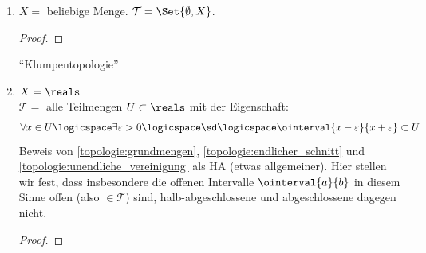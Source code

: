 \begin{beispiele}
    \begin{enumerate}
        \item \label{klumpentopologie}\( X= \) beliebige Menge. \( \mathcal{T}=\Set{\emptyset, X} \).
        \begin{proof}
        \end{proof}
        \enquote{Klumpentopologie}
        
        \item \label{standard-topologie}\( X=\reals \)\\
        \( \mathcal{T}= \) alle Teilmengen \( U\subset \reals \) mit der Eigenschaft:
        \begin{align*}
            \forall  x\in U\logicspace\exists\varepsilon>0\logicspace\text{\sd}\logicspace \ointerval{x-\varepsilon}{x+\varepsilon}\subset U
        \end{align*}
        Beweis von \ref{topologie:grundmengen}, \ref{topologie:endlicher_schnitt} und \ref{topologie:unendliche_vereinigung} als HA (etwas allgemeiner).
        Hier stellen wir fest, dass insbesondere die offenen Intervalle \( \ointerval{a}{b} \) in diesem Sinne offen (also \( \in \mathcal{T} \)) sind, halb-abgeschlossene und abgeschlossene dagegen nicht.
        \begin{proof}
            

\end{proof}
\end{enumerate}
\end{beispiele}
